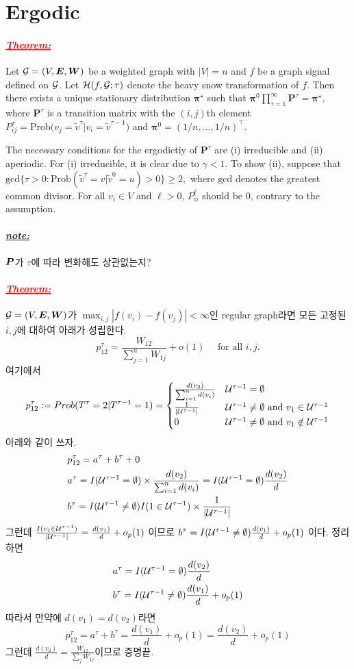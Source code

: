 \documentclass[12pt,oneside,english,a4paper]{article}
\def\note{\paragraph{\Large\textit{\underline{note:}}}\Large}
\newcommand{\parared}[1]{\paragraph{\Large\textcolor{red}{\it\underline{\textbf{#1:}}}}\Large}
\newcommand{\bsE}{\mbox{\boldmath $E$}}
\newcommand{\bsP}{\mbox{\boldmath $P$}}
\newcommand{\bsW}{\mbox{\boldmath $W$}}
\begin{document}
\section{Ergodic}
\parared{Theorem} Let ${\cal G}=(V,{\boldsymbol E},{\boldsymbol W})$ be a weighted graph with $|V|=n$ and $f$ be a graph signal defined on ${\cal G}$. Let ${\cal H}(f,{\cal G};\tau)$ denote the heavy snow transformation of $f$. Then there exists a unique stationary distribution ${\boldsymbol \pi}^{\star}$ such that 
$
{\boldsymbol\pi}^{0}\prod_{\tau=1}^{\infty}{\boldsymbol P}^{\tau}={\boldsymbol \pi}^{\star}, 
$
where ${\boldsymbol P}^{\tau}$ is a transition matrix with the $(i,j)$th element $P_{ij}^{\tau}=\mbox{Prob}\big(v_j=\tilde{v}^{\tau}|v_i=\tilde{v}^{\tau-1}\big)$ and ${\boldsymbol\pi}^{0}=(1/n,\dots,1/n)^\top$.

\proof The necessary conditions for the ergodictiy of ${\boldsymbol{P}^{\tau}}$ are (i) irreducible and (ii) aperiodic. For (i) irreducible, it is clear due to $\gamma<1$. To show (ii), suppose that 
$
\mbox{gcd}\{\tau>0: \mbox{Prob}(\tilde v^{\tau}=v | \tilde v^{0}=u)>0\} \geq 2, 
$
where $\mbox{gcd}$ denotes the greatest common divisor. For all $v_i \in V$ and $\ell >0$, $P_{ii}^{\ell}$ should be $0$, contrary to the assumption. 

\note $\bsP$가 $\tau$에 따라 변화해도 상관없는지? 

\parared{Theorem} ${\cal G}=(V,\bsE,\bsW)$가 $\max_{i,j}|f(v_i)-f(v_j)|<\infty$인 regular graph라면 모든 고정된 $i,j$에 대하여 아래가 성립한다. 
\[
p_{12}^{\tau} = \frac{W_{12}}{\sum_{j=1}^{n}W_{1j}}+o(1) \quad \mbox{ for all } i,j.
\]
여기에서 
\[
p_{12}^\tau:=Prob(T^{\tau}=2|T^{\tau-1}=1)=
\begin{cases}
\frac{d(v_2)}{\sum_{i=1}^{n}d(v_i)} & {\cal U}^{\tau-1}=\emptyset \\ 
\frac{1}{|{\cal U}^{\tau-1}|} & {\cal U}^{\tau-1} \neq \emptyset \mbox{ and } v_1 \in {\cal U}^{\tau-1}\\ 
0 & {\cal U}^{\tau-1} \neq \emptyset \mbox{ and } v_1 \notin {\cal U}^{\tau-1}
\end{cases}
\]
\proof 
아래와 같이 쓰자.
\begin{align*}
& p_{12}^{\tau}=a^{\tau}+b^{\tau}+0 \\ 
& a^{\tau} = I({\cal U}^{\tau-1}=\emptyset)\times \frac{d(v_2)}{\sum_{i=1}^n d(v_i)}=I({\cal U}^{\tau-1}=\emptyset)\frac{d(v_2)}{d} \\
& b^{\tau} = I({\cal U}^{\tau-1}\neq\emptyset)I(1\in{\cal U}^{\tau-1})\times \frac{1}{|{\cal U}^{\tau-1}|} 
\end{align*}
그런데 $\frac{I(v_1\in{\cal U}^{\tau-1})}{|{\cal U}^{\tau-1}|}=\frac{d(v_1)}{d}+o_p(1)$ 이므로 $b^{\tau}=I({\cal U}^{\tau-1}\neq \emptyset)\frac{d(v_1)}{d}+o_p(1)$ 이다. 정리하면
\begin{align*}
& a^{\tau} =I({\cal U}^{\tau-1}=\emptyset)\frac{d(v_2)}{d} \\
& b^{\tau} = I({\cal U}^{\tau-1}\neq\emptyset)\frac{d(v_1)}{d}+o_p(1)
\end{align*}
따라서 만약에 $d(v_1)=d(v_2)$라면 
\[
p_{12}^{\tau}=a^{\tau}+b^{\tau}=\frac{d(v_1)}{d}+o_p(1)=\frac{d(v_2)}{d}+o_p(1)
\]
그런데 $\frac{d(v_2)}{d}=\frac{W_{12}}{\sum_jW_{1j}}$이므로 증명끝. 
\end{document}
